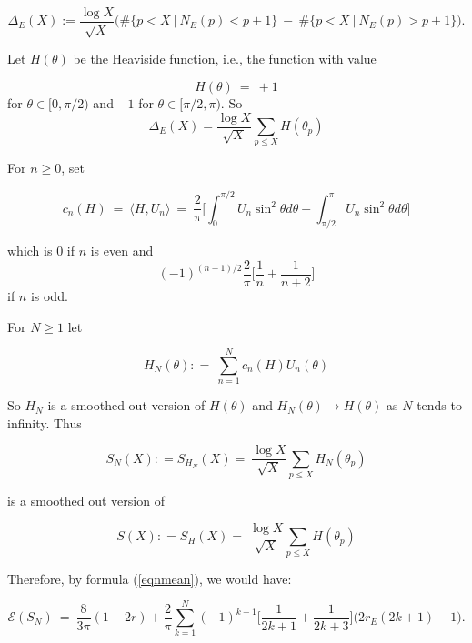 \documentclass[11pt]{article}
\theoremstyle{plain}
\theoremstyle{definition}
\numberwithin{equation}{section}
\numberwithin{figure}{section}
\numberwithin{table}{section}
\begin{document}
$$\Delta_E(X):={\frac{\log X}{\sqrt X}}\big(\#\{ p < X\ | \ N_E(p) < p+1\}\ - \ \#\{ p < X\ | \ N_E(p) > p+1\}\big).$$


Let $H(\theta)$ be the Heaviside function, i.e., the function with value

\begin{equation}
H(\theta) \ = \ +1
\end{equation}
 for $\theta \in [0, \pi/2)$ and  $-1$ for $\theta \in [\pi/2, \pi)$.  So
\begin{equation}
\Delta_E(X) = {\frac{\log X}{\sqrt X}}\sum_{p\le X} H(\theta_p)
\end{equation}


For $n \ge 0$, set


\begin{equation}
c_n(H)  \ = \ \langle H, U_n\rangle \ = \ {\frac{2}{\pi}}\big[\int_0^{\pi/2}U_n\sin^2\theta d \theta - \int_{\pi/2}^{\pi}U_n\sin^2\theta d \theta \big]
\end{equation}


which is $0$ if $n$ is even and $$(-1)^{(n-1)/2}{\frac{2}{\pi}}\big[{\frac{1}{n}} + {\frac{1}{n+2}}\big]$$ if $n$ is odd.



For $N \ge 1$ let

\begin{equation}
H_N(\theta): = \ \sum_{n=1}^Nc_n(H)U_n(\theta)
\end{equation}


So $H_N$ is a smoothed out version of $H(\theta)$ and $H_N(\theta) \to H(\theta)$ as $N $ tends to infinity.  Thus

\begin{equation}
S_N(X): = S_{H_N}(X) = \ {\frac{\log X}{{\sqrt{X}}}}\sum_{p \le X}H_N(\theta_p)
\end{equation}


is a smoothed out version of

\begin{equation}\label{smooth}
S(X): = S_{H}(X) = \ {\frac{\log X}{{\sqrt{X}}}}\sum_{p \le X}H(\theta_p)
\end{equation}

Therefore, by formula (\ref{eqnmean}), we would have:

\begin{equation}\label{early}
{\mathcal E}(S_N)\ = \ {\frac{8}{3\pi}}(1-2r) + {\frac{2}{\pi}} \sum_{k=1}^{N}  (-1)^{k+1}\big[{\frac{1}{2k+1}} + {\frac{1}{2k+3}}\big]\big(2r_E(2k+1)-1\big).
\end{equation}
\end{document}
